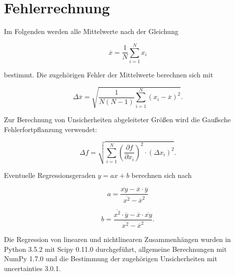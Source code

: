 \section{Fehlerrechnung}
\label{sec:Fehler}

Im Folgenden werden alle Mittelwerte nach der Gleichung

\begin{equation}
	\overline{x} = \dfrac{1}{N} \sum_{i = 1}^{N} x_i
	\label{eqn:mean}
\end{equation}

bestimmt. Die zugehörigen Fehler der Mittelwerte berechnen sich mit

\begin{equation}
	\Delta\overline{x} = \sqrt{\dfrac{1}{N\left(N-1\right)} \sum_{i = 1}^{N} \left(x_i - \overline{x}\right)^2}.
	\label{eqn:std}
\end{equation}

Zur Berechnung von Unsicherheiten abgeleiteter Größen wird die Gaußsche Fehlerfortpflanzung verwendet:

\begin{equation}
	\Delta f = \sqrt{\sum_{i = 1}^{N} \left(\dfrac{\partial f}{\partial x_i}\right)^2 \cdot \left(\Delta x_i\right)^2}.
	\label{eqn:gauss}
\end{equation}

Eventuelle Regressionsgeraden $y = ax + b$ berechnen sich nach

\begin{equation}
	a = \dfrac{\overline{xy} - \overline{x} \cdot \overline{y}}{\overline{x^2} - \overline{x}^2}
\end{equation}

\begin{equation}
	b = \dfrac{\overline{x^2} \cdot \overline{y} - \overline{x} \cdot \overline{xy}}{\overline{x^2} - \overline{x}^2}.
\end{equation}

Die Regression von linearen und nichtlinearen Zusammenhängen wurden in Python 3.5.2 mit Scipy 0.11.0 durchgeführt, allgemeine Berechnungen mit NumPy 1.7.0 und die Bestimmung der zugehörigen Unsicherheiten mit uncertainties 3.0.1.
